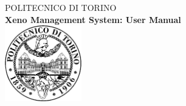 \begin{titlepage}

\begin{center}


\textsc{\LARGE POLITECNICO DI TORINO}\\[1cm]

{ \huge \bfseries Xeno Management System: User Manual}\\[1cm]

\includegraphics[width=0.25\textwidth]{./logo.eps}\\[1.5cm] 


\vfill

\end{center}

\end{titlepage}